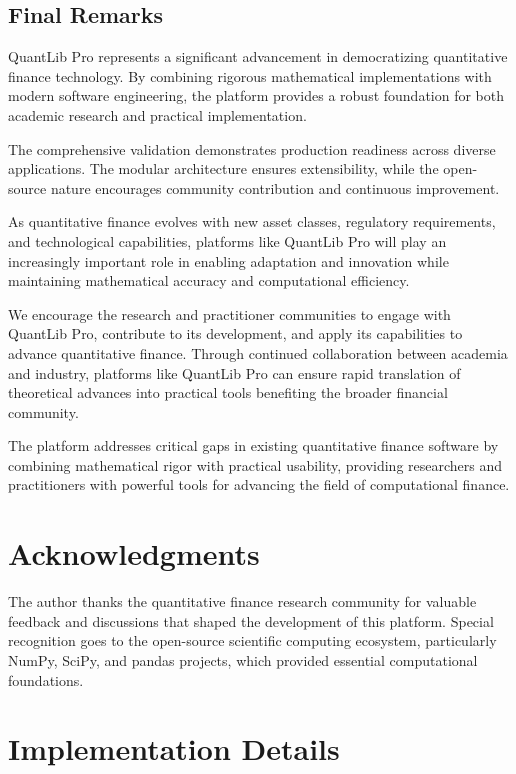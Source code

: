 \documentclass[12pt,a4paper]{article}
\theoremstyle{definition}
\theoremstyle{remark}
\begin{document}
\subsection{Final Remarks}

QuantLib Pro represents a significant advancement in democratizing quantitative finance technology. By combining rigorous mathematical implementations with modern software engineering, the platform provides a robust foundation for both academic research and practical implementation.

The comprehensive validation demonstrates production readiness across diverse applications. The modular architecture ensures extensibility, while the open-source nature encourages community contribution and continuous improvement.

As quantitative finance evolves with new asset classes, regulatory requirements, and technological capabilities, platforms like QuantLib Pro will play an increasingly important role in enabling adaptation and innovation while maintaining mathematical accuracy and computational efficiency.

We encourage the research and practitioner communities to engage with QuantLib Pro, contribute to its development, and apply its capabilities to advance quantitative finance. Through continued collaboration between academia and industry, platforms like QuantLib Pro can ensure rapid translation of theoretical advances into practical tools benefiting the broader financial community.

The platform addresses critical gaps in existing quantitative finance software by combining mathematical rigor with practical usability, providing researchers and practitioners with powerful tools for advancing the field of computational finance.

\section*{Acknowledgments}

The author thanks the quantitative finance research community for valuable feedback and discussions that shaped the development of this platform. Special recognition goes to the open-source scientific computing ecosystem, particularly NumPy, SciPy, and pandas projects, which provided essential computational foundations.

\appendix

\section{Implementation Details}
\end{document}
